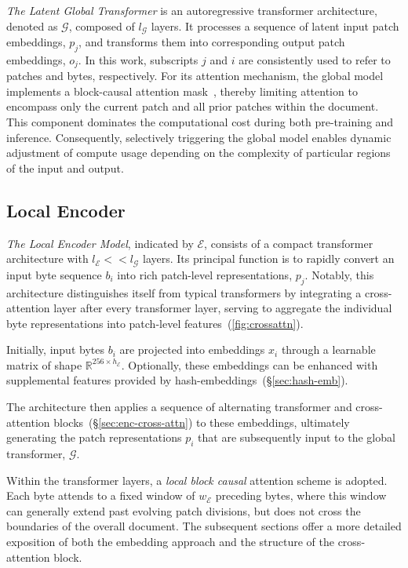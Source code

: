 \textit{The Latent Global Transformer} is an autoregressive transformer architecture, denoted as $\mathcal{G}$, composed of $l_{\mathcal{G}}$ layers. It processes a sequence of latent input patch embeddings, $p_j$, and transforms them into corresponding output patch embeddings, $o_j$. In this work, subscripts $j$ and $i$ are consistently used to refer to patches and bytes, respectively. For its attention mechanism, the global model implements a block-causal attention mask~\citep{dubey2024llama}, thereby limiting attention to encompass only the current patch and all prior patches within the document. This component dominates the computational cost during both pre-training and inference. Consequently, selectively triggering the global model enables dynamic adjustment of compute usage depending on the complexity of particular regions of the input and output.

\subsection{Local Encoder}
\label{section:local}

\textit{The Local Encoder Model}, indicated by $\mathcal{E}$, consists of a compact transformer architecture with $l_{\mathcal{E}} << l_{\mathcal{G}}$ layers. Its principal function is to rapidly convert an input byte sequence $b_i$ into rich patch-level representations, $p_j$. Notably, this architecture distinguishes itself from typical transformers by integrating a cross-attention layer after every transformer layer, serving to aggregate the individual byte representations into patch-level features~(\autoref{fig:crossattn}).

Initially, input bytes $b_i$ are projected into embeddings $x_i$ through a learnable matrix of shape $\mathbb{R}^{256 \times h_{\mathcal{E}}}$. Optionally, these embeddings can be enhanced with supplemental features provided by hash-embeddings~(\S\ref{sec:hash-emb}). 

The architecture then applies a sequence of alternating transformer and cross-attention blocks~(\S\ref{sec:enc-cross-attn}) to these embeddings, ultimately generating the patch representations $p_i$ that are subsequently input to the global transformer, $\mathcal{G}$. 

Within the transformer layers, a \textit{local block causal} attention scheme is adopted. Each byte attends to a fixed window of $w_{\mathcal{E}}$ preceding bytes, where this window can generally extend past evolving patch divisions, but does not cross the boundaries of the overall document. The subsequent sections offer a more detailed exposition of both the embedding approach and the structure of the cross-attention block.

